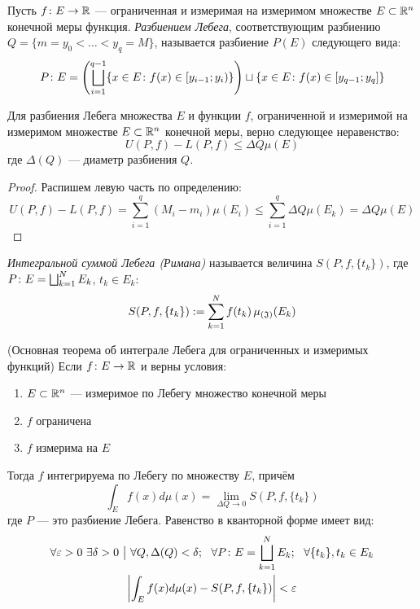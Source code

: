 \begin{definition}
	Пусть $f \colon E \to \mathbb{R}$ --- ограниченная и измеримая на измеримом множестве $E \subset \mathbb{R}^n$ конечной меры функция. \textit{Разбиением Лебега}, соответствующим разбиению $Q = \{m = y_0 < \ldots < y_q = M\}$, называется разбиение $P(E)$ следующего вида:
	\[
		P \colon E = \left(\bigsqcup_{i = 1}^{q - 1} \{x \in E \colon f(x) \in \left[y_{i - 1}; y_i\right)\}\right) \sqcup \{x \in E \colon f(x) \in [y_{q - 1}; y_q]\}
	\]
\end{definition}

\begin{proposition} \label{uminl-le-dqe}
	Для разбиения Лебега множества $E$ и функции $f$, ограниченной и измеримой на измеримом множестве $E \subset \mathbb{R}^n$ конечной меры, верно следующее неравенство:
	\[
		U(P, f) - L(P, f) \le \Delta Q \mu(E)
	\]
	где $\Delta(Q)$ --- диаметр разбиения $Q$.
\end{proposition}

\begin{proof}
	Распишем левую часть по определению:
	\[
		U(P, f) - L(P, f) = \sum_{i = 1}^q (M_i - m_i)\mu(E_i) \le \sum_{i = 1}^q \Delta Q\mu(E_k) = \Delta Q \mu(E)
	\]
\end{proof}

\begin{definition}
	\textit{Интегральной суммой Лебега (Римана)} называется величина $S(P, f, \{t_k\})$, где $P \colon E = \bigsqcup_{k = 1}^N E_k$, $t_k \in E_k$:
	\[
		S(P, f, \{t_k\}) := \sum_{k = 1}^N f(t_k) \operatorname{\mu_{(\mathfrak{J})}}(E_k)
	\]
\end{definition}

\begin{theorem} (Основная теорема об интеграле Лебега для ограниченных и измеримых функций)
	Если $f \colon E \to \mathbb{R}$ и верны условия:
	\begin{enumerate}
		\item $E \subset \mathbb{R}^n$ --- измеримое по Лебегу множество конечной меры
		
		\item $f$ ограничена
		
		\item $f$ измерима на $E$
	\end{enumerate}
	Тогда $f$ интегрируема по Лебегу по множеству $E$, причём
	\[
		\int_E f(x)d\mu(x) = \lim_{\Delta Q \to 0} S(P, f, \{t_k\})
	\]
	где $P$ --- это разбиение Лебега. Равенство в кванторной форме имеет вид:
	\begin{multline*}
		\forall \eps > 0\ \exists \delta > 0 \such \forall Q, \Delta(Q) < \delta;\ \ \forall P \colon E = \bscup_{k = 1}^N E_k;\ \ \forall \{t_k\}, t_k \in E_k
		\\
		\mo{\int_E f(x)d\mu(x) - S(P, f, \{t_k\})} < \eps
	\end{multline*}
\end{theorem}

